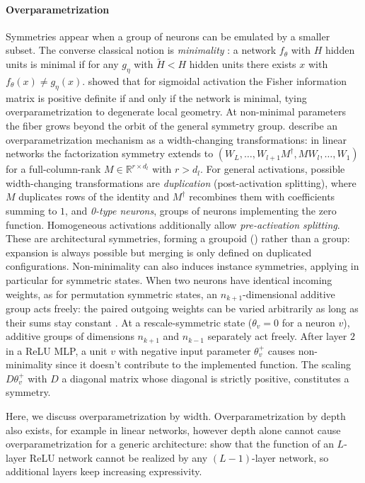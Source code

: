 \documentclass[mathematics,review,submit,moreauthors]{Definitions/mdpi}
\begin{document}
\paragraph{Overparametrization}
Symmetries appear when a group of neurons can be emulated by a smaller subset.
The converse classical notion is \emph{minimality} \citep{sussmann1992nn,fukumizu1996nn,brea2019,simsek2021,grillo2026,gegenfurtner2026}: a network $f_\theta$ with $H$ hidden units is minimal if for any $g_\eta$ with $\tilde{H}<H$ hidden units there exists $x$ with $f_\theta(x)\neq g_\eta(x)$.
\citet{fukumizu1996nn} showed that for sigmoidal activation the Fisher information matrix is positive definite if and only if the network is minimal, tying overparametrization to degenerate local geometry.
At non-minimal parameters the fiber grows beyond the orbit of the general symmetry group.
\citet{sareen2026} describe an overparametrization mechanism as a width-changing transformations: in linear networks the factorization symmetry extends to $(W_L,\dots,W_{l+1}M^{\dagger},MW_l,\dots,W_1)$ for a full-column-rank $M\in\mathbb{R}^{r\times d_l}$ with $r>d_l$.
For general activations, possible width-changing transformations are \emph{duplication} (post-activation splitting), where $M$ duplicates rows of the identity and $M^{\dagger}$ recombines them with coefficients summing to $1$, and \emph{0-type neurons}, groups of neurons implementing the zero function.
Homogeneous activations additionally allow \emph{pre-activation splitting}.
These are architectural symmetries, forming a groupoid () rather than a group: expansion is always possible but merging is only defined on duplicated configurations.
Non-minimality can also induces instance symmetries, applying in particular for symmetric states.
When two neurons have identical incoming weights, as for permutation symmetric states, an $n_{k+1}$-dimensional additive group acts freely: the paired outgoing weights can be varied arbitrarily as long as their sums stay constant \citep{brea2019}.
At a rescale-symmetric state ($\theta_v=0$ for a neuron $v$), additive groups of dimensions $n_{k+1}$ and $n_{k-1}$ separately act freely.
After layer $2$ in a ReLU MLP, a unit $v$ with negative input parameter $\theta^+_v$ causes non-minimality since it doesn't contribute to the implemented function.
The scaling $D\theta^+_v$ with $D$ a diagonal matrix whose diagonal is strictly positive, constitutes a symmetry.

\begin{Remark}
    Here, we discuss overparametrization by width.
    Overparametrization by depth also exists, for example in linear networks, however depth alone cannot cause overparametrization for a generic architecture: \citet{grillo2026} show that the function of an $L$-layer ReLU network cannot be realized by any $(L-1)$-layer network, so additional layers keep increasing expressivity.
\end{Remark}
\end{document}

